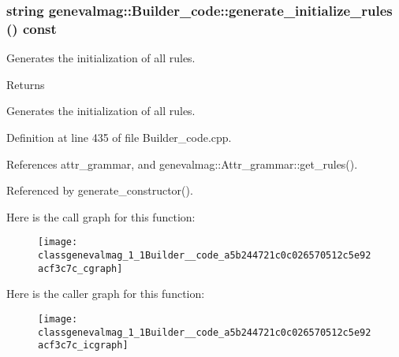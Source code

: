 \hypertarget{classgenevalmag_1_1Builder__code_a5b244721c0c026570512c5e92acf3c7c}{
\subsubsection[{generate\_\-initialize\_\-rules}]{\setlength{\rightskip}{0pt plus 5cm}string genevalmag::Builder\_\-code::generate\_\-initialize\_\-rules () const}}
\label{classgenevalmag_1_1Builder__code_a5b244721c0c026570512c5e92acf3c7c}
Generates the initialization of all rules. \begin{DoxyReturn}{Returns}

\end{DoxyReturn}
Generates the initialization of all rules. 

Definition at line 435 of file Builder\_\-code.cpp.



References attr\_\-grammar, and genevalmag::Attr\_\-grammar::get\_\-rules().



Referenced by generate\_\-constructor().



Here is the call graph for this function:\nopagebreak
\begin{figure}[H]
\begin{center}
\leavevmode
\texttt{[image: classgenevalmag\_1\_1Builder\_\_code\_a5b244721c0c026570512c5e92acf3c7c\_cgraph]}
\end{center}
\end{figure}




Here is the caller graph for this function:\nopagebreak
\begin{figure}[H]
\begin{center}
\leavevmode
\texttt{[image: classgenevalmag\_1\_1Builder\_\_code\_a5b244721c0c026570512c5e92acf3c7c\_icgraph]}
\end{center}
\end{figure}


